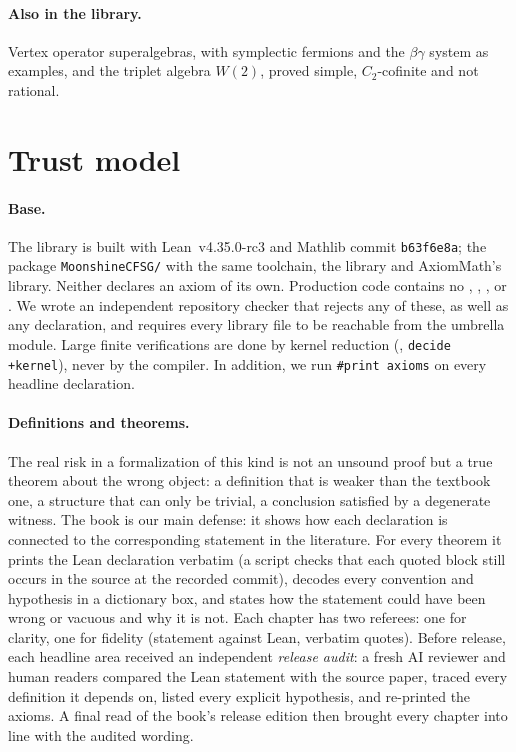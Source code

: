 \documentclass[10pt]{article}
\begin{document}
\paragraph{Also in the library.} Vertex operator superalgebras, with symplectic fermions and the $\beta\gamma$
system as examples, and the triplet algebra $W(2)$, proved simple, $C_2$-cofinite and not rational.

\section{Trust model}\label{sec:trust}

\paragraph{Base.} The library is built with Lean~v4.35.0-rc3 and Mathlib commit \texttt{b63f6e8a}; the package
\texttt{MoonshineCFSG/} with the same toolchain, the library and AxiomMath's library. Neither declares an axiom of its
own.
Production code contains no , , ,  or
. We wrote an independent repository checker that rejects any of these, as well as any
 declaration, and requires every library file to be reachable from the umbrella module. Large finite
verifications are done by kernel reduction (, \texttt{decide +kernel}), never by the compiler. In addition,
we run \texttt{\#print axioms} on every headline declaration.

\paragraph{Definitions and theorems.} The real risk in a formalization of this kind is not an unsound proof but a true
theorem about the wrong object: a definition that is weaker than the textbook one, a structure that can only be
trivial, a conclusion satisfied by a degenerate witness.
The book is our main defense: it shows how each declaration is connected to the corresponding statement in the
literature.
For every theorem it prints the Lean declaration verbatim (a script checks that each
quoted block still occurs in the source at the recorded commit), decodes every convention and hypothesis in a
dictionary box, and states how the statement could have been wrong or vacuous and why it is not. Each chapter has
two referees: one for clarity, one for fidelity (statement against Lean, verbatim quotes). Before release, each
headline area received an independent \emph{release audit}: a fresh AI reviewer and human readers
compared the Lean statement with the source paper, traced every definition it depends on,
listed every explicit hypothesis, and re-printed the axioms. A final read of the book's release edition then brought every chapter into line with the audited wording.
\end{document}
